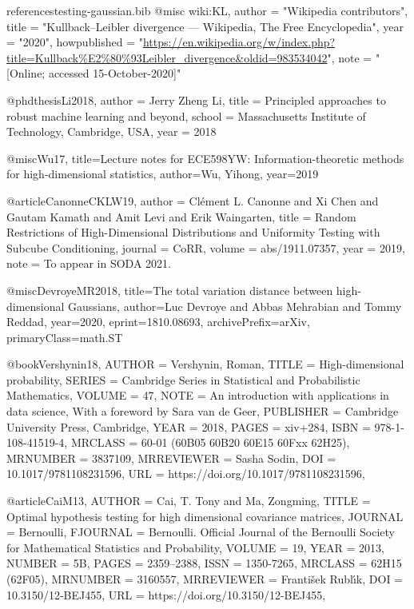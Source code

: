 \documentclass[10pt]{article}
\theoremstyle{plain}
\begin{document}
\begin{filecontents}{referencestesting-gaussian.bib}
@misc{ wiki:KL,
    author = "{Wikipedia contributors}",
    title = "Kullback–Leibler divergence --- {Wikipedia}{,} The Free Encyclopedia",
    year = "2020",
    howpublished = "\url{https://en.wikipedia.org/w/index.php?title=Kullback%E2%80%93Leibler_divergence&oldid=983534042}",
    note = "[Online; accessed 15-October-2020]"
  }
  
@phdthesis{Li2018,
  author    = {Jerry Zheng Li},
  title     = {Principled approaches to robust machine learning and beyond},
  school    = {Massachusetts Institute of Technology, Cambridge, {USA}},
  year      = {2018}
}

@misc{Wu17,
  title={Lecture notes for {ECE598YW}: Information-theoretic methods for high-dimensional statistics},
  author={Wu, Yihong},
  year={2019}
}

@article{CanonneCKLW19,
  author    = {Cl{\'{e}}ment L. Canonne and
               Xi Chen and
               Gautam Kamath and
               Amit Levi and
               Erik Waingarten},
  title     = {Random Restrictions of High-Dimensional Distributions and Uniformity
               Testing with Subcube Conditioning},
  journal   = {CoRR},
  volume    = {abs/1911.07357},
  year      = {2019},
  note = {To appear in SODA 2021.}
}

@misc{DevroyeMR2018,
      title={The total variation distance between high-dimensional Gaussians}, 
      author={Luc Devroye and Abbas Mehrabian and Tommy Reddad},
      year={2020},
      eprint={1810.08693},
      archivePrefix={arXiv},
      primaryClass={math.ST}
}

@book{Vershynin18,
    AUTHOR = {Vershynin, Roman},
     TITLE = {High-dimensional probability},
    SERIES = {Cambridge Series in Statistical and Probabilistic Mathematics},
    VOLUME = {47},
      NOTE = {An introduction with applications in data science,
              With a foreword by Sara van de Geer},
 PUBLISHER = {Cambridge University Press, Cambridge},
      YEAR = {2018},
     PAGES = {xiv+284},
      ISBN = {978-1-108-41519-4},
   MRCLASS = {60-01 (60B05 60B20 60E15 60Fxx 62H25)},
  MRNUMBER = {3837109},
MRREVIEWER = {Sasha Sodin},
       DOI = {10.1017/9781108231596},
       URL = {https://doi.org/10.1017/9781108231596},
}

@article{CaiM13,
    AUTHOR = {Cai, T. Tony and Ma, Zongming},
     TITLE = {Optimal hypothesis testing for high dimensional covariance
              matrices},
   JOURNAL = {Bernoulli},
  FJOURNAL = {Bernoulli. Official Journal of the Bernoulli Society for
              Mathematical Statistics and Probability},
    VOLUME = {19},
      YEAR = {2013},
    NUMBER = {5B},
     PAGES = {2359--2388},
      ISSN = {1350-7265},
   MRCLASS = {62H15 (62F05)},
  MRNUMBER = {3160557},
MRREVIEWER = {Franti\v{s}ek Rubl\'{\i}k},
       DOI = {10.3150/12-BEJ455},
       URL = {https://doi.org/10.3150/12-BEJ455},
}



\end{filecontents}
\end{document}

